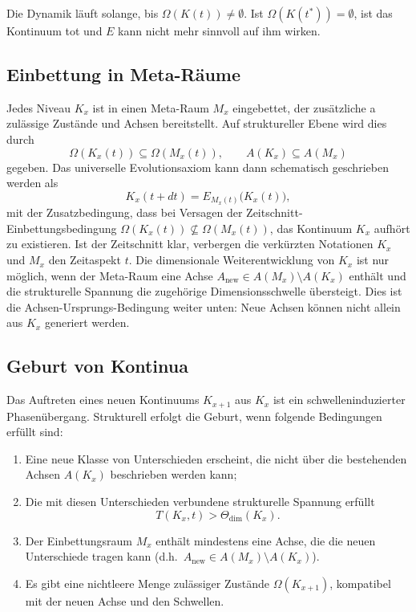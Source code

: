 Die Dynamik läuft solange, bis \(\Omega(K(t)) \neq \emptyset\).
Ist \(\Omega(K(t^\ast)) = \emptyset\), ist das Kontinuum tot und \(E\) kann
nicht mehr sinnvoll auf ihm wirken.

\subsection{Einbettung in Meta-Räume}

Jedes Niveau \(K_x\) ist in einen Meta-Raum \(M_x\) eingebettet, der zusätzliche
a zulässige Zustände und Achsen bereitstellt.
Auf struktureller Ebene wird dies durch
\[
    \Omega(K_x(t)) \subseteq \Omega(M_x(t)), \qquad
    A(K_x) \subseteq A(M_x)
\]
gegeben.
Das universelle Evolutionsaxiom kann dann schematisch geschrieben werden als
\[
    K_x(t+dt) = E_{M_x(t)}\big(K_x(t)\big),
\]
mit der Zusatzbedingung, dass bei Versagen der Zeitschnitt-Einbettungsbedingung
\(\Omega(K_x(t))\not\subseteq\Omega(M_x(t))\), das Kontinuum \(K_x\)
aufhört zu existieren. Ist der Zeitschnitt klar, verbergen die verkürzten
Notationen \(K_x\) und \(M_x\) den Zeitaspekt \(t\).
Die dimensionale Weiterentwicklung von \(K_x\) ist nur möglich, wenn der Meta-Raum
eine Achse \(A_{\mathrm{new}}\in A(M_x)\setminus A(K_x)\) enthält und die
strukturelle Spannung die zugehörige Dimensionsschwelle übersteigt. Dies ist die
Achsen-Ursprungs-Bedingung weiter unten: Neue Achsen können nicht allein aus
\(K_x\) generiert werden.

\subsection{Geburt von Kontinua}

Das Auftreten eines neuen Kontinuums \(K_{x+1}\) aus \(K_x\) ist ein
schwelleninduzierter Phasenübergang.
Strukturell erfolgt die Geburt, wenn folgende Bedingungen erfüllt sind:

\begin{enumerate}
    \item Eine neue Klasse von Unterschieden erscheint, die nicht über die bestehenden
          Achsen \(A(K_x)\) beschrieben werden kann;
    \item Die mit diesen Unterschieden verbundene strukturelle Spannung erfüllt
          \[
              T(K_x,t) > \Theta_{\mathrm{dim}}(K_x).
          \]
    \item Der Einbettungsraum \(M_x\) enthält mindestens eine Achse, die die
          neuen Unterschiede tragen kann (d.h.\ \(A_{\mathrm{new}} \in A(M_x)
          \setminus A(K_x)\)).
    \item Es gibt eine nichtleere Menge zulässiger Zustände
          \(\Omega(K_{x+1})\), kompatibel mit der neuen Achse und den
          Schwellen.
\end{enumerate}

